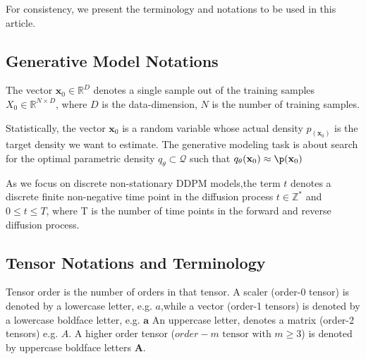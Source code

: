 \documentclass[11pt]{article}
\begin{document}
    For consistency, we present the terminology and notations to be used in this article.

    \subsection{Generative Model Notations}\label{subsec:generative-model-notations}

    The vector $\mathbf{x}_0 \in \mathbb{R}^{D}$ denotes a single sample out of the training samples $X_0 \in \mathbb{R}^{N \times D}$,
    where $D$ is the data-dimension, $N$ is the number of training samples.

    Statistically, the vector $\mathbf{x}_0$ is a random variable whose actual density $p_(\mathbf{x}_0)$
    is the target density we want to estimate.
    The generative modeling task is about search for the optimal parametric density $q_{\theta} \subset \mathcal{Q}$
    such that $q_{\theta}(\mathbf{x}_0) \approx \p(\mathbf{x}_0)$


    As we focus on discrete non-stationary DDPM models,the term $t$ denotes a discrete finite non-negative time
    point in the diffusion process $t \in \mathbb{Z}^{*}$ and $0 \leq t \leq T$, where T is the number of time points in the forward and reverse diffusion process.

    \subsection{Tensor Notations and Terminology}\label{subsec:tensor-notations-and-terminology}
    Tensor order is the number of orders in that tensor.
    A scaler (order-0 tensor) is denoted by a lowercase letter, e.g. $a$,while a vector (order-1 tensors) is denoted
    by a lowercase boldface letter, e.g. $\mathbf{a}$
    An uppercase letter, denotes a matrix (order-2 tensors) e.g. $A$.
    A higher order tensor ($order-m \text{ tensor}\text{ with }m \geq 3$) is denoted by uppercase boldface letters $\mathbf{A}$.
\end{document}
